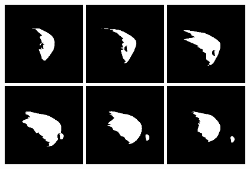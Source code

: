 \documentclass[11pt]{article}
\begin{document}
\begin{figure}[p]
\includegraphics[width=3.5cm]{figs/22_test48_update2/output.0007.syn.png}
\includegraphics[width=3.5cm]{figs/22_test48_update2/output.0008.syn.png}
\includegraphics[width=3.5cm]{figs/22_test48_update2/output.0009.syn.png}
\includegraphics[width=3.5cm]{figs/22_test48_update2/output.0010.syn.png}
\includegraphics[width=3.5cm]{figs/22_test48_update2/output.0011.syn.png}
\includegraphics[width=3.5cm]{figs/22_test48_update2/output.0012.syn.png}

\end{figure}
\end{document}
